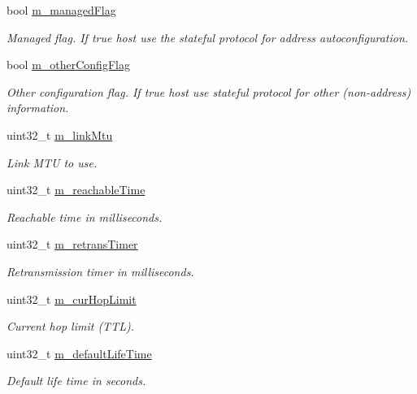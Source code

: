 \begin{DoxyCompactItemize}
bool \hyperlink{classns3_1_1RadvdInterface_a963e57a2f2a860c82e9ecab0c9f273ec}{m\+\_\+managed\+Flag}
\begin{DoxyCompactList}\small\item\em Managed flag. If true host use the stateful protocol for address autoconfiguration. \end{DoxyCompactList}\item 
bool \hyperlink{classns3_1_1RadvdInterface_a79d80eab87a65685723abd069bfb1a2e}{m\+\_\+other\+Config\+Flag}
\begin{DoxyCompactList}\small\item\em Other configuration flag. If true host use stateful protocol for other (non-\/address) information. \end{DoxyCompactList}\item 
uint32\+\_\+t \hyperlink{classns3_1_1RadvdInterface_af5697655181c68cd0617ddd1724dd7a5}{m\+\_\+link\+Mtu}
\begin{DoxyCompactList}\small\item\em Link M\+TU to use. \end{DoxyCompactList}\item 
uint32\+\_\+t \hyperlink{classns3_1_1RadvdInterface_a2545ba2a8e79e1fa0ffdc153011b8d20}{m\+\_\+reachable\+Time}
\begin{DoxyCompactList}\small\item\em Reachable time in milliseconds. \end{DoxyCompactList}\item 
uint32\+\_\+t \hyperlink{classns3_1_1RadvdInterface_a7d4c8887ded7cf251aae36e9061965f0}{m\+\_\+retrans\+Timer}
\begin{DoxyCompactList}\small\item\em Retransmission timer in milliseconds. \end{DoxyCompactList}\item 
uint32\+\_\+t \hyperlink{classns3_1_1RadvdInterface_ad6f1a73f0e78b7f57c935b1ccffc5adc}{m\+\_\+cur\+Hop\+Limit}
\begin{DoxyCompactList}\small\item\em Current hop limit (T\+TL). \end{DoxyCompactList}\item 
uint32\+\_\+t \hyperlink{classns3_1_1RadvdInterface_a30cef69bc3ca9c49d5768dc6e4f25006}{m\+\_\+default\+Life\+Time}
\begin{DoxyCompactList}\small\item\em Default life time in seconds. \end{DoxyCompactList}\item 

\end{DoxyCompactItemize}
